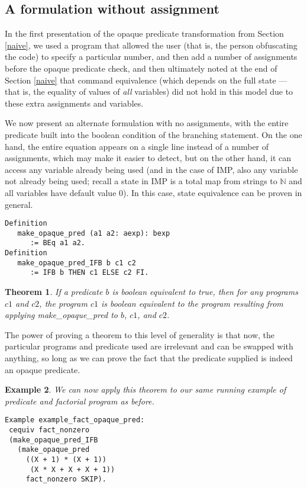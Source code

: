 \documentclass[compsoc,conference,a4paper,10pt,times]{IEEEtran}
\newtheorem{theorem}{Theorem}[section]
\newtheorem{example}[theorem]{Example}
\begin{document}
\subsection{A formulation without assignment}\label{noass}
In the first presentation of the opaque predicate transformation from Section \ref{naive}, we used a program that allowed
the user (that is, the person obfuscating the code) to specify a particular number, and then add a number of assignments before the
opaque predicate check, and then ultimately noted at the end of Section \ref{naive} that command equivalence (which depends on the full state --- that is, the equality of values of \emph{all} variables) did not
hold in this model due to these extra assignments and variables.
\par
We now present an alternate formulation with no assignments, with the entire predicate
built into the boolean condition of the branching statement. On the one hand, the entire
equation appears on a single line instead of a number of assignments, which may make it
easier to detect, but on the other hand, it can access any variable already being used (and
in the case of IMP, also any variable not already being used; recall a state in IMP is a total map
from strings to $\mathbb{N}$ and all variables have default value 0).  In this case, state equivalence can be proven in general.

\begin{verbatim}
Definition 
   make_opaque_pred (a1 a2: aexp): bexp 
      := BEq a1 a2.
Definition 
   make_opaque_pred_IFB b c1 c2 
      := IFB b THEN c1 ELSE c2 FI.
\end{verbatim}

\begin{theorem}\label{generalcequiv}
If a predicate $b$ is boolean equivalent to true, then for any programs $c1$ and $c2$,
the program $c1$ is boolean equivalent to the program resulting from applying make\_opaque\_pred
to $b$, $c1$, and $c2$. 
\end{theorem}

The power of proving a theorem to this level of generality is that now, the particular programs and predicate used are irrelevant and can be swapped with anything, so long as we can prove the fact that the predicate supplied is indeed an opaque predicate.

\begin{example}\label{factopaqueex}
We can now apply this theorem to our same running example of predicate and factorial program as before.
\begin{verbatim}
Example example_fact_opaque_pred: 
 cequiv fact_nonzero 
 (make_opaque_pred_IFB 
   (make_opaque_pred 
     ((X + 1) * (X + 1)) 
      (X * X + X + X + 1)) 
     fact_nonzero SKIP).
\end{verbatim}
\end{example}
\end{document}
